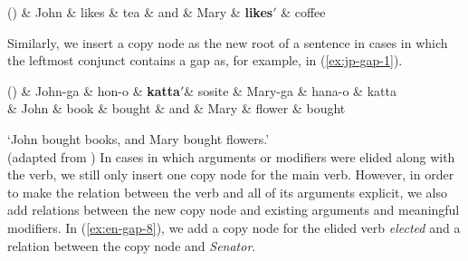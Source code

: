 \documentclass[11pt]{article}
\newenvironment{myquote}%
  {\list{}{\leftmargin=0.0in\rightmargin=0.0in}\item[]}%
  {\endlist}
\newcounter{excounter}
\begin{document}
\begin{myquote}
\label{ex:en-gap-7}
\footnotesize
  \begin{dependency}[edge unit distance=2.5ex]
    \begin{deptext}[column sep=0.2cm]
    (\theexcounter) \& John \& likes \& tea \& and \& Mary \& \textbf{likes$'$} \& coffee \\
    \end{deptext}
  \end{dependency}
\end{myquote}
Similarly, we insert a copy node as the new root of a sentence in cases in which the leftmost conjunct contains a gap as, for example, in (\ref{ex:jp-gap-1}).
\begin{myquote}
  \label{ex:jp-gap-enhanced}
  \footnotesize
  \begin{dependency}[edge unit distance=2.5ex]
    \begin{deptext}[column sep=-0.025cm]
     (\theexcounter) \& John-ga \& hon-o \& \textbf{katta$'$}\& sosite  \& Mary-ga \& hana-o \& {katta} \\
     \& John  \& book \& bought \& and \& Mary \& flower \& bought \\
    \end{deptext}
  \end{dependency}
  \trans `John bought books, and Mary bought flowers.' \\ \null \hfill (adapted from )
\end{myquote}
In cases in which arguments or modifiers were elided along with the verb, we still only insert one copy node for the main verb. However, in order to make the relation between the verb and all of its arguments explicit, we also add relations between the new copy node and existing arguments and meaningful modifiers. In (\ref{ex:en-gap-8}), we add a copy node for the elided verb \textit{elected} and a relation between the copy node and \textit{Senator}.
\end{document}
